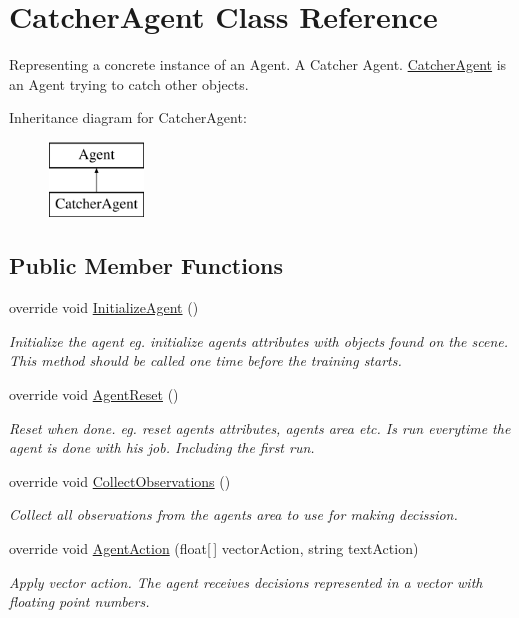 \hypertarget{class_catcher_agent}{}\section{Catcher\+Agent Class Reference}
\label{class_catcher_agent}


Representing a concrete instance of an Agent. A Catcher Agent. \mbox{\hyperlink{class_catcher_agent}{Catcher\+Agent}} is an Agent trying to catch other objects.  


Inheritance diagram for Catcher\+Agent\+:\begin{figure}[H]
\begin{center}
\leavevmode
\includegraphics[height=2.000000cm]{class_catcher_agent}
\end{center}
\end{figure}
\subsection*{Public Member Functions}
\begin{DoxyCompactItemize}
\item 
override void \mbox{\hyperlink{class_catcher_agent_aeb871db4779f1da715e829b40c6087b0}{Initialize\+Agent}} ()
\begin{DoxyCompactList}\small\item\em Initialize the agent eg. initialize agents attributes with objects found on the scene. This method should be called one time before the training starts. \end{DoxyCompactList}\item 
override void \mbox{\hyperlink{class_catcher_agent_aece1c1e97740166d52f5ed4defbe9ace}{Agent\+Reset}} ()
\begin{DoxyCompactList}\small\item\em Reset when done. eg. reset agents attributes, agents area etc. Is run everytime the agent is done with his job. Including the first run. \end{DoxyCompactList}\item 
override void \mbox{\hyperlink{class_catcher_agent_ab8de74f6eb16a987980e951a442ab247}{Collect\+Observations}} ()
\begin{DoxyCompactList}\small\item\em Collect all observations from the agents area to use for making decission. \end{DoxyCompactList}\item 
override void \mbox{\hyperlink{class_catcher_agent_a255f4b05c7f722b4d92cfeb6563d963d}{Agent\+Action}} (float\mbox{[}$\,$\mbox{]} vector\+Action, string text\+Action)
\begin{DoxyCompactList}\small\item\em Apply vector action. The agent receives decisions represented in a vector with floating point numbers. \end{DoxyCompactList}\end{DoxyCompactItemize}
